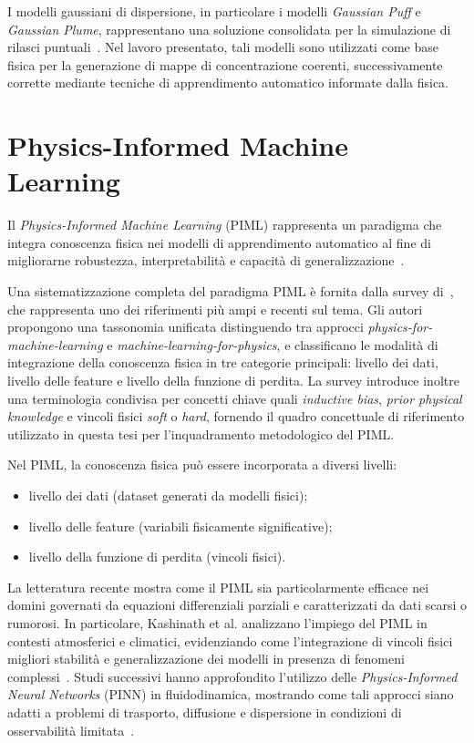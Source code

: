 I modelli gaussiani di dispersione, in particolare i modelli \emph{Gaussian Puff} e \emph{Gaussian Plume}, rappresentano una soluzione consolidata per la simulazione di rilasci puntuali~\cite{turner_gaussian}.
Nel lavoro presentato, tali modelli sono utilizzati come base fisica per la generazione di mappe di concentrazione coerenti, successivamente corrette mediante tecniche di apprendimento automatico informate dalla fisica.

\section{Physics-Informed Machine Learning}
\label{sec:piml}

Il \emph{Physics-Informed Machine Learning} (PIML) rappresenta un paradigma che integra conoscenza fisica nei modelli di apprendimento automatico al fine di migliorarne robustezza, interpretabilità e capacità di generalizzazione~\cite{karniadakis_piml, meng_piml}.

Una sistematizzazione completa del paradigma PIML è fornita dalla survey di~\cite{meng2025piml}, che rappresenta uno dei riferimenti più ampi e recenti sul tema. Gli autori propongono una tassonomia unificata distinguendo tra approcci \textit{physics-for-machine-learning} e \textit{machine-learning-for-physics}, e classificano le modalità di integrazione della conoscenza fisica in tre categorie principali: livello dei dati, livello delle feature e livello della funzione di perdita. La survey introduce inoltre una terminologia condivisa per concetti chiave quali \textit{inductive bias}, \textit{prior physical knowledge} e vincoli fisici \textit{soft} o \textit{hard}, fornendo il quadro concettuale di riferimento utilizzato in questa tesi per l’inquadramento metodologico del PIML.

Nel PIML, la conoscenza fisica può essere incorporata a diversi livelli:
\begin{itemize}
    \item livello dei dati (dataset generati da modelli fisici);
    \item livello delle feature (variabili fisicamente significative);
    \item livello della funzione di perdita (vincoli fisici).
\end{itemize}

La letteratura recente mostra come il PIML sia particolarmente efficace nei domini governati da equazioni differenziali parziali e caratterizzati da dati scarsi o rumorosi.
In particolare, Kashinath et al. analizzano l’impiego del PIML in contesti atmosferici e climatici, evidenziando come l’integrazione di vincoli fisici migliori stabilità e generalizzazione dei modelli in presenza di fenomeni complessi~\cite{kashinath2021piml}.
Studi successivi hanno approfondito l’utilizzo delle \emph{Physics-Informed Neural Networks} (PINN) in fluidodinamica, mostrando come tali approcci siano adatti a problemi di trasporto, diffusione e dispersione in condizioni di osservabilità limitata~\cite{elhassan2025pinnsparse}.

